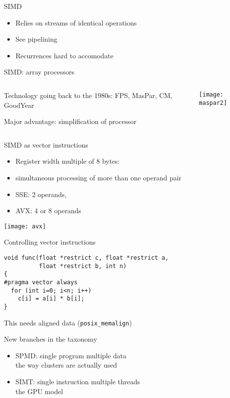 \begin{numberedframe}{SIMD}
  \begin{itemize}
  \item Relies on streams of identical operations
  \item See pipelining
  \item Recurrences hard to accomodate
  \end{itemize}
\end{numberedframe}

\begin{numberedframe}{SIMD: array processors}
  \begin{columns}
    \begin{column}{.5\textwidth}
      Technology going back to the 1980s: FPS, MasPar, CM, GoodYear

      Major advantage: simplification of processor
    \end{column}
    \begin{column}{.5\textwidth}
      \texttt{[image: maspar2]}
    \end{column}
  \end{columns}
\end{numberedframe}

\begin{numberedframe}{SIMD as vector instructions}
  \begin{itemize}
  \item Register width multiple of 8 bytes:
  \item simultaneous processing of more than one operand pair
  \item SSE: 2 operands,
  \item AVX: 4 or 8 operands
  \end{itemize}
  \texttt{[image: avx]}
\end{numberedframe}

\begin{numberedframe}{Controlling vector instructions}
\begin{lstlisting}
void func(float *restrict c, float *restrict a,
          float *restrict b, int n)
{
#pragma vector always
  for (int i=0; i<n; i++)
    c[i] = a[i] * b[i];
}
\end{lstlisting}
This needs aligned data (\verb+posix_memalign+)
\end{numberedframe}

\begin{numberedframe}{New branches in the taxonomy}
  \begin{itemize}
  \item SPMD: single program multiple data\\
    the way clusters are actually used
  \item SIMT: single instruction multiple threads\\
    the GPU model
  \end{itemize}
\end{numberedframe}

